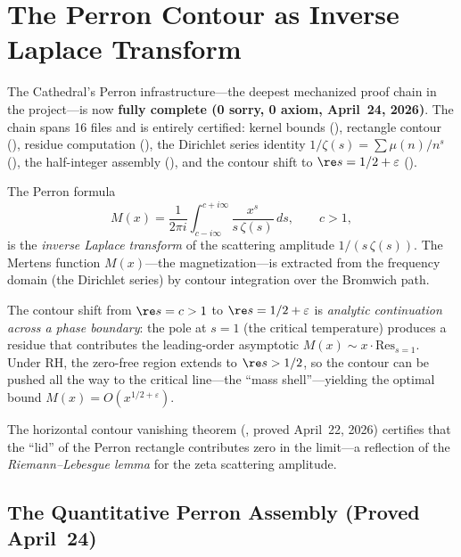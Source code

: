 \section{The Perron Contour as Inverse Laplace Transform}
\label{sec:perron}

The Cathedral's Perron infrastructure---the deepest mechanized proof chain
in the project---is now \textbf{fully complete (0 sorry, 0 axiom, April~24, 2026)}.
The chain spans 16 files and is entirely certified:
kernel bounds (), rectangle contour
(), residue computation
(), the Dirichlet series identity
$1/\zeta(s) = \sum \mu(n)/n^s$ (),
the half-integer assembly (), and the
contour shift to $\re s = 1/2 + \varepsilon$ ().

\begin{principle}
The Perron formula
\[
  M(x) = \frac{1}{2\pi i}
  \int_{c - i\infty}^{c + i\infty}
  \frac{x^s}{s\,\zeta(s)}\,ds,
  \qquad c > 1,
\]
is the \emph{inverse Laplace transform} of the scattering amplitude
$1/(s\,\zeta(s))$. The Mertens function $M(x)$---the magnetization---is
extracted from the frequency domain (the Dirichlet series) by contour
integration over the Bromwich path.

The contour shift from $\re s = c > 1$ to $\re s = 1/2 + \varepsilon$
is \emph{analytic continuation across a phase boundary}: the pole at $s = 1$
(the critical temperature) produces a residue that contributes the
leading-order asymptotic $M(x) \sim x \cdot \mathrm{Res}_{s=1}$. Under RH,
the zero-free region extends to $\re s > 1/2$, so the contour can be
pushed all the way to the critical line---the ``mass shell''---yielding
the optimal bound $M(x) = O(x^{1/2+\varepsilon})$.

The horizontal contour vanishing theorem (,
proved April~22, 2026) certifies that the ``lid'' of the Perron rectangle
contributes zero in the limit---a reflection of the \emph{Riemann--Lebesgue
lemma} for the zeta scattering amplitude.
\end{principle}

\subsection{The Quantitative Perron Assembly (Proved April~24)}

